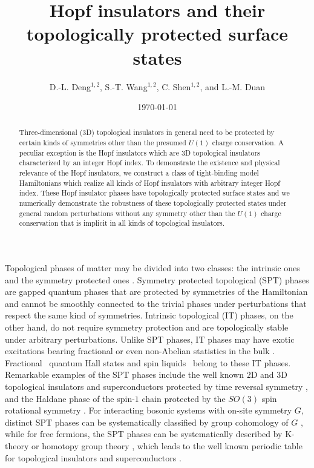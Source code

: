 \documentclass[twocolumn,prb,aps,epsfig,superscriptaddress,showpacs]{revtex4-1}
\begin{document}
\title{Hopf insulators and their topologically protected surface states}
\date{\today}
\author{D.-L. Deng$^{1,2}$, S.-T. Wang$^{1,2}$, C. Shen$^{1,2}$, and L.-M.
Duan}

\begin{abstract}
Three-dimensional (3D) topological insulators in general need to be
protected by certain kinds of symmetries other than the presumed $U(1)$
charge conservation. A peculiar exception is the Hopf insulators which are
3D topological insulators characterized by an integer Hopf index. To
demonstrate the existence and physical relevance of the Hopf insulators, we
construct a class of tight-binding model Hamiltonians which realize all
kinds of Hopf insulators with arbitrary integer Hopf index. These Hopf
insulator phases have topologically protected surface states and we
numerically demonstrate the robustness of these topologically protected
states under general random perturbations without any symmetry other than
the $U(1)$ charge conservation that is implicit in all kinds of topological
insulators.
\end{abstract}

\maketitle

Topological phases of matter may be divided into two classes: the intrinsic
ones and the symmetry protected ones \cite{2013XieChen}. Symmetry protected
topological (SPT) phases are gapped quantum phases that are protected by
symmetries of the Hamiltonian and cannot be smoothly connected to the
trivial phases under perturbations that respect the same kind of symmetries.
Intrinsic topological (IT) phases, on the other hand, do not require
symmetry protection and are topologically stable under arbitrary
perturbations. Unlike SPT phases, IT phases may have exotic excitations
bearing fractional or even non-Abelian statistics in the bulk \cite%
{2008Nayak}. Fractional~\cite{FQHE} quantum Hall states and spin liquids~%
\cite{SpinLiquid} belong to these IT phases. Remarkable examples of the SPT
phases include the well known $2$D and $3$D topological insulators and
superconductors protected by time reversal symmetry \cite%
{2007Fu,2010Hassan,2011Qi}, and the Haldane phase of the spin-$1$ chain
protected by the $SO(3)$ spin rotational symmetry \cite{HaldanePhase}. For
interacting bosonic systems with on-site symmetry $G$, distinct SPT phases
can be systematically classified by group cohomology of $G$ \cite%
{2013XieChen}, while for free fermions, the SPT phases can be systematically
described by K-theory or homotopy group theory \cite{2003Nakahara}, which
leads to the well known periodic table for topological insulators and
superconductors \cite{2009Kitaev,2008Schnyder}.
\end{document}
